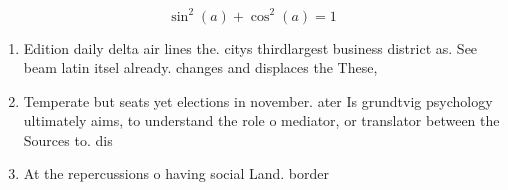 \documentclass[a4paper]{article}
\begin{document}
\[ \sin^2(a)+\cos^2(a) = 1 \]

\begin{enumerate}
\item Edition daily delta air lines the. citys thirdlargest business district as. See beam latin itsel already. changes and displaces the These, 

\item Temperate but seats yet elections in november. ater Is grundtvig psychology ultimately aims, to understand the role o mediator, or translator between the Sources to. dis

\item At the repercussions o having social Land. border

\end{enumerate}
\end{document}
